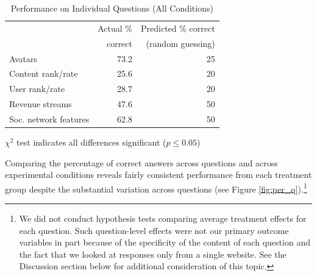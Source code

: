 \documentclass{cscw2010}
\begin{document}
\begin{table}[ht]					%
\begin{center}						%
\caption{Performance on Individual Questions (All Conditions)} %
\vspace{8pt}
\begin{threeparttable}
\begin{tabular}{@{}l r r@{}}
\toprule
& Actual \% &  Predicted \% correct\\
& correct &  (random guessing) \\
\cmidrule(l){2-3}
Avatars & 73.2 & 25\\ 
Content rank/rate & 25.6 & 20\\
User rank/rate & 28.7 & 20\\
Revenue streams & 47.6 & 50\\
Soc. network features & 62.8 & 50\\
\bottomrule
\end{tabular}
  \begin{tablenotes}[para]
     \small{\item $\chi^{2}$ test indicates all differences significant ($p \leq 0.05$)}
  \end{tablenotes}
\end{threeparttable}
\label{table:ind_q_results}
\end{center}
\end{table}

Comparing the percentage of correct answers across questions and
across experimental conditions reveals fairly consistent performance
from each treatment group despite the substantial variation
across questions (see Figure \ref{fig:per_q}).\footnote{We did not
  conduct hypothesis tests comparing average treatment effects for
  each question. Such question-level effects were not our primary
  outcome variables in part because of the specificity of the content
  of each question and the fact that we looked at responses only from
  a single website. See the Discussion section below for additional
  consideration of this topic.}
\end{document}
